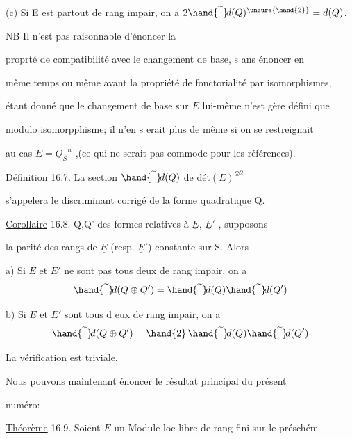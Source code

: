 
(c) Si E est partout de rang impair, on a $2\hand{\widetilde{\phantom{d}}}\!d(Q)^{\unsure{\hand{2}}} = d(Q)$.



 \quad NB Il n'est pas raisonnable d'énoncer la

proprté de compatibilité avec le changement de base, s ans énoncer en

même temps\hand{,} ou même avant\hand{,} la propriété de fonctorialité par isomorphismes,

étant donné que le changement de base sur $\underline{E}$ lui-même n'est gère défini que

modulo isomorpphisme; il n'en s erait plus de même si on se restreignait

au cas $E = \underline{O}_S{}^n$ ,(ce qui ne serait pas commode pour les références).

 \quad \uline{Définition} 16.7. La section $\hand{\widetilde{\phantom{d}}}\!d(Q)$ de $\text{dét}(E)^{\otimes 2}$

s'appelera le \uline{discriminant corrigé} de la forme quadratique Q.

\uline{Corollaire} 16.8.  Q,Q' des formes relatives à $\underline{E}$, $\underline{E}'$ , supposons

la parité des rangs de $\underline{E}$ (resp. $\underline{E}'$) constante sur S. Alors

a) Si $\underline{E}$ et $\underline{E}'$ ne sont pas tous deux de rang impair, on a
\[ \hand{\widetilde{\phantom{d}}}\!d(Q \oplus Q') = \hand{\widetilde{\phantom{d}}}\!d(Q)\hand{\widetilde{\phantom{d}}}\!d(Q') \]

b) Si $\underline{E}$ et $\underline{E}'$ sont tous d eux de rang impair, on a
\[ \hand{\widetilde{\phantom{d}}}\!d(Q \oplus Q') = \hand{2}\,\hand{\widetilde{\phantom{d}}}\!d(Q)\hand{\widetilde{\phantom{d}}}\!d(Q') \]

La vérification est triviale.

Nous pouvons maintenant énoncer le résultat principal du présent

numéro:

\uline{Théorème} 16.9. Soient $\underline{E}$ un Module loc libre de rang fini sur le préschém-%

